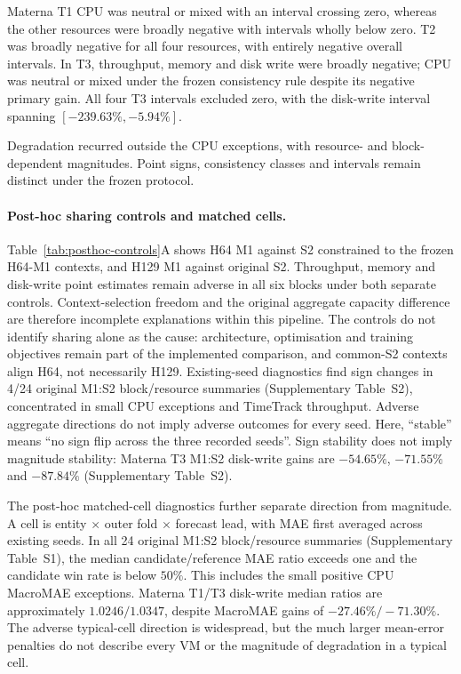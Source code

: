 \documentclass[5p,twocolumn]{elsarticle}
\begin{document}
Materna T1 CPU was neutral or mixed with an interval crossing zero, whereas
the other resources were broadly negative with intervals wholly below zero.
T2 was broadly negative for all four resources, with entirely negative
overall intervals. In T3, throughput, memory and disk write were broadly
negative; CPU was neutral or mixed under the frozen consistency rule despite
its negative primary gain. All four T3 intervals excluded zero, with the
disk-write interval spanning $[-239.63\%,-5.94\%]$.

Degradation recurred outside the CPU exceptions, with resource- and
block-dependent magnitudes. Point signs, consistency classes and intervals
remain distinct under the frozen protocol.

\paragraph{Post-hoc sharing controls and matched cells.}
Table~\ref{tab:posthoc-controls}A shows H64 M1 against S2 constrained to the
frozen H64-M1 contexts, and H129 M1 against original S2. Throughput, memory
and disk-write point estimates remain adverse in all six blocks under both
separate controls. Context-selection freedom and the original aggregate
capacity difference are therefore incomplete explanations within this
pipeline. The controls do not identify sharing alone as the cause:
architecture, optimisation and training objectives remain part of the
implemented comparison, and common-S2 contexts align H64, not necessarily
H129. Existing-seed diagnostics find sign changes in 4/24 original M1:S2
block/resource summaries (Supplementary Table~S2), concentrated in small
CPU exceptions and TimeTrack throughput. Adverse aggregate directions do not
imply adverse outcomes for every seed. Here, ``stable'' means ``no sign flip
across the three recorded seeds''. Sign stability does not imply magnitude
stability: Materna T3 M1:S2 disk-write gains are $-54.65\%$, $-71.55\%$ and
$-87.84\%$ (Supplementary Table~S2).

The post-hoc matched-cell diagnostics further separate direction from
magnitude. A cell is entity $\times$ outer fold $\times$ forecast lead, with
MAE first averaged across existing seeds. In all 24 original M1:S2
block/resource summaries (Supplementary Table~S1), the median candidate/reference MAE ratio exceeds
one and the candidate win rate is below $50\%$. This includes the small
positive CPU MacroMAE exceptions. Materna T1/T3 disk-write median ratios are
approximately $1.0246/1.0347$, despite MacroMAE gains of
$-27.46\%/-71.30\%$. The adverse typical-cell direction is widespread, but
the much larger mean-error penalties do not describe every VM or the
magnitude of degradation in a typical cell.
\end{document}
